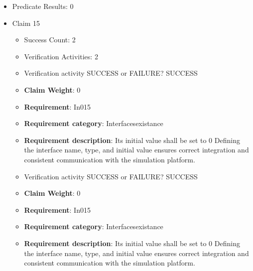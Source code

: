 \documentclass{article}
\begin{document}
\begin{itemize}
\begin{itemize}
					\item Verification activity SUCCESS or FAILURE? SUCCESS
					\item \textbf{Claim Weight}: 0
						\item \textbf{Requirement}: In014 
						\item \textbf{Requirement category}: Interfacesexistance 
						\item \textbf{Requirement description}: It represents the presence of an AEB brake torque request. Defining the interface name, type, and initial value ensures correct integration and consistent communication with the simulation platform.
					
				\end{itemize}
				
									    
				\item Predicate Results: 0

  				  \item Claim 15
				\begin{itemize}
			    	\item Success Count: 2 
			    	\item Verification Activities: 2
					\item Verification activity SUCCESS or FAILURE? SUCCESS
					\item \textbf{Claim Weight}: 0
						\item \textbf{Requirement}: In015 
						\item \textbf{Requirement category}: Interfacesexistance 
						\item \textbf{Requirement description}: Its initial value shall be set to 0 Defining the interface name, type, and initial value ensures correct integration and consistent communication with the simulation platform.
					
					\item Verification activity SUCCESS or FAILURE? SUCCESS
					\item \textbf{Claim Weight}: 0
						\item \textbf{Requirement}: In015 
						\item \textbf{Requirement category}: Interfacesexistance 
						\item \textbf{Requirement description}: Its initial value shall be set to 0 Defining the interface name, type, and initial value ensures correct integration and consistent communication with the simulation platform.
					
				\end{itemize}
				

\end{itemize}
\end{document}
